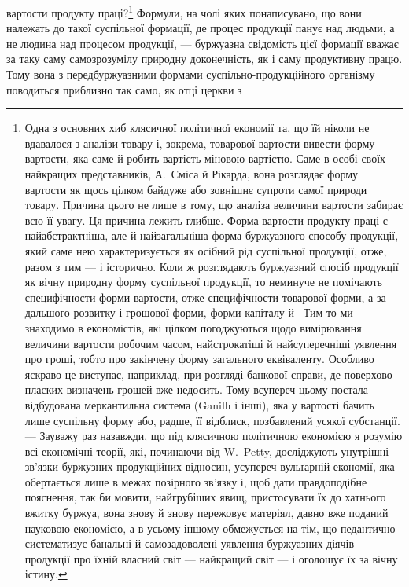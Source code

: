 \parcont{}  %
вартости продукту праці?\footnote{
Одна з основних хиб клясичної політичної економії та, що їй ніколи
не вдавалося з аналізи товару і, зокрема, товарової вартости вивести
форму вартости, яка саме й робить вартість міновою вартістю. Саме в особі
своїх найкращих представників, А.~Сміса й Рікарда, вона розглядає форму
вартости як щось цілком байдуже або зовнішнє супроти самої природи
товару. Причина цього не лише в тому, що аналіза величини вартости
забирає всю її увагу. Ця причина лежить глибше. Форма вартости продукту
праці є найабстрактніша, але й найзагальніша форма буржуазного
способу продукції, який саме нею характеризується як осібний рід суспільної
продукції, отже, разом з тим — і історично. Коли ж розглядають
буржуазний спосіб продукції як вічну природну форму суспільної продукції,
то неминуче не помічають специфічности форми вартости, отже
специфічности товарової форми, а за дальшого розвитку і грошової форми,
форми капіталу й~ Тим то ми знаходимо в економістів, які цілком
погоджуються щодо вимірювання величини вартости робочим часом, найстрокатіші
й найсуперечніші уявлення про гроші, тобто про закінчену
форму загального еквіваленту. Особливо яскраво це виступає, наприклад,
при розгляді банкової справи, де поверхово пласких визначень грошей
вже недосить. Тому всупереч цьому постала відбудована меркантильна
система (Ganilh і інші), яка у вартості бачить лише суспільну форму
або, радше, її відблиск, позбавлений усякої субстанції. — Зауважу раз
назавжди, що під клясичною політичною економією я розумію всі економічні
теорії, які, починаючи від W.~Petty, досліджують унутрішні зв’язки
буржузних продукційних відносин, усупереч вульґарній економії, яка
обертається лише в межах позірного зв’язку і, щоб дати правдоподібне
пояснення, так би мовити, найгрубіших явищ, пристосувати їх до хатнього
вжитку буржуа, вона знову й знову пережовує матеріял, давно вже поданий
науковою економією, а в усьому іншому обмежується на тім, що
педантично систематизує банальні й самозадоволені уявлення буржуазних
діячів продукції про їхній власний світ — найкращий світ — і оголошує
їх за вічну істину.
} Формули, на чолі яких понаписувано,
що вони належать до такої суспільної формації, де процес продукції
панує над людьми, а не людина над процесом продукції, —
буржуазна свідомість цієї формації вважає за таку саму самозрозумілу
природну доконечність, як і саму продуктивну працю.
Тому вона з передбуржуазними формами суспільно-продукційного
організму поводиться приблизно так само, як отці церкви з
